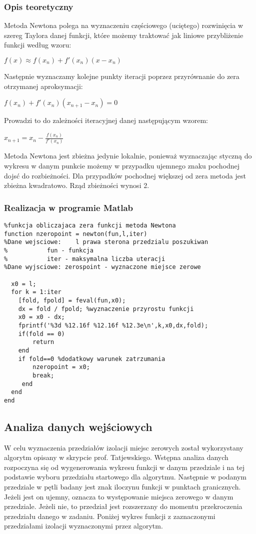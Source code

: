 \documentclass[a4paper, 11pt]{article}
\begin{document}
\subsubsection{Opis teoretyczny}
Metoda Newtona polega na wyznaczeniu częściowego (uciętego) rozwinięcia w szereg Taylora danej funkcji, które możemy traktować jak liniowe przybliżenie funkcji według wzoru:\
  	\begin{center}
  	$f(x) \approx f(x_{n})+f'(x_{n})(x-x_{n})$
	\end{center}
Następnie wyznaczamy kolejne punkty iteracji poprzez przyrównanie do zera otrzymanej aproksymacji:\\
\begin{center}
$f(x_{n})+f'(x_{n})(x_{n+1}-x_{n}) = 0$
\end{center}
Prowadzi to do zależności iteracyjnej danej następującym wzorem:\\
\begin{center}
$x_{n+1} = x_{n}-\frac{f(x_{n})}{f'(x_{n})}$
\end{center}
Metoda Newtona jest zbieżna jedynie lokalnie, ponieważ wyznaczając styczną do wykresu w danym punkcie możemy w przypadku ujemnego znaku pochodnej dojsć do rozbieżności. Dla przypadków pochodnej większej od zera metoda jest zbieżna kwadratowo. Rząd zbieżności wynosi 2.

\subsubsection{Realizacja w programie Matlab}
\begin{lstlisting}
%funkcja obliczajaca zera funkcji metoda Newtona
function nzeropoint = newton(fun,l,iter)
%Dane wejsciowe:	l prawa sterona przedzialu poszukiwan
%			fun - funkcja 
%			iter - maksymalna liczba uteracji
%Dane wyjsciowe: zerospoint - wyznaczone miejsce zerowe
    
  x0 = l; 
  for k = 1:iter
    [fold, fpold] = feval(fun,x0); 
    dx = fold / fpold; %wyznaczenie przyrostu funkcji
    x0 = x0 - dx;
    fprintf('%3d %12.16f %12.16f %12.3e\n',k,x0,dx,fold);
    if(fold == 0)
        return
    end
	if fold==0 %dodatkowy warunek zatrzumania
        nzeropoint = x0;
        break; 
     end
  end
end
\end{lstlisting}

\subsection{Analiza danych wejściowych}
W celu wyznaczenia przedziałów izolacji miejsc zerowych został wykorzystany algorytm opisany w skrypcie prof. Tatjewskiego. Wstępna analiza danych rozpoczyna się od wygenerowania wykresu funkcji w danym przedziale i na tej podstawie wyboru przedziału startowego dla algorytmu. Następnie w podanym przedziale w pętli badany jest znak iloczynu funkcji w punktach granicznych. Jeżeli jest on ujemny, oznacza to występowanie miejsca zerowego w danym przedziale. Jeżeli nie, to przedział jest rozszerzany do momentu przekroczenia przedziału danego w zadaniu. 
Poniżej wykres funkcji z zaznaczonymi przedziałami izolacji wyznaczonymi przez algorytm. 
\end{document}
